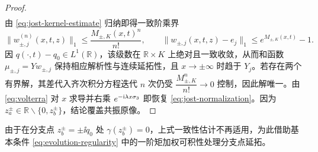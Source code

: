 \begin{proof}
\begin{equation}
\begin{aligned}
\end{aligned}
\end{equation}
由 \eqref{eq:jost-kernel-estimate} 归纳即得一致阶乘界
\begin{equation}\label{eq:jost-factorial}
\|w_{\pm,j}^{(n)}(x,t,z)\|_1\le\dfrac{M_{\pm,K}(x,t)^n}{n!},\qquad
\|w_{\pm,j}(x,t,z)-e_j\|_1\le e^{M_{\pm,K}(x,t)}-1.
\end{equation}
因 $q(\cdot,t)-q_0\in L^1(\mathbb R)$，该级数在 $\mathbb R\times K$ 上绝对且一致收敛，从而和函数 $\mu_{\pm,j}=Yw_{\pm,j}$ 保持相应解析性与连续延拓性，且 $x\to\pm\infty$ 时趋于 $Y_j$。若存在两个有界解，其差代入齐次积分方程迭代 $n$ 次仍受 $\dfrac{M_{\pm,K}^n}{n!}\to0$ 控制，因此解唯一。由 \eqref{eq:volterra} 对 $x$ 求导并右乘 $e^{-\mathrm{i}\lambda x\sigma_3}$ 即恢复 \eqref{eq:jost-normalization}。因为 $z_a^\pm\in\mathbb R\mathbin{\backslash}\{0,z_b^\pm\}$，结论覆盖共振原像。
\end{proof}

由于在分支点 $z_b^\pm=\pm\ii q_0$ 处 $\gamma(z_b^\pm)=0$，上式一致性估计不再适用，为此借助基本条件 \eqref{eq:evolution-regularity} 中的一阶矩加权可积性处理分支点延拓\cite{ZhangFan2020}。


